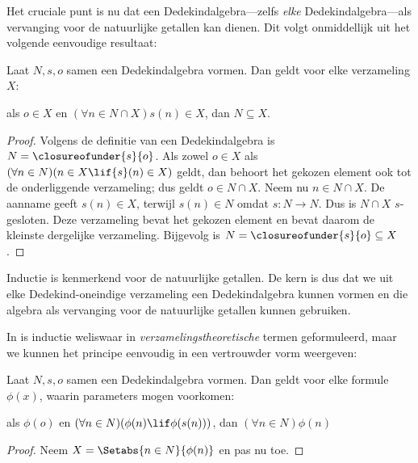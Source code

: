 \documentclass[../../../include/open-logic-section]{subfiles}
\begin{document}

Het cruciale punt is nu dat een Dedekindalgebra---zelfs \emph{elke}
Dedekindalgebra---als vervanging voor de natuurlijke getallen kan
dienen. Dit volgt onmiddellijk uit het volgende eenvoudige resultaat:

\begin{thm}
Laat $N, s, o$ samen een Dedekindalgebra vormen. Dan geldt voor elke
verzameling $X$:
	\begin{center}
		als $o \in X$ en $(\forall {n} \in N \cap X){s}({n}) \in X$, {dan} $N \subseteq X$.
	\end{center}
\end{thm}

\begin{proof}
Volgens de definitie van een Dedekindalgebra is $N =
\closureofunder{s}{o}$. Als zowel ${o} \in X$ als $(\forall {n} \in
N)(n \in X \lif {s}({n}) \in X)$ geldt, dan behoort het gekozen
element ook tot de onderliggende verzameling; dus geldt ${o} \in N
\cap X$. Neem nu ${n} \in N \cap X$. De aanname geeft
${s}({n}) \in X$, terwijl
${s}({n}) \in N$ omdat $s \colon N \to N$. Dus is $N \cap X$
$s$-gesloten. Deze verzameling bevat het gekozen element en bevat
daarom de kleinste dergelijke verzameling. Bijgevolg is $N =
\closureofunder{s}{o} \subseteq X$.
\end{proof}

Inductie is kenmerkend voor de natuurlijke getallen. De kern is dus dat
we uit elke Dedekind-oneindige verzameling een Dedekindalgebra kunnen
vormen en die algebra als vervanging voor de natuurlijke getallen
kunnen gebruiken.

In  is inductie weliswaar in
\emph{verzamelingstheoretische} termen geformuleerd, maar we kunnen
het principe eenvoudig in een vertrouwder vorm weergeven:

\begin{cor}
Laat $N, s, o$ samen een Dedekindalgebra vormen. Dan geldt voor elke
formule $\phi(x)$, waarin parameters mogen voorkomen:
\begin{center}
	als $\phi(o)$ en $(\forall {n} \in N)(\phi(n)\lif
	\phi({s}({n})))$, {dan} $(\forall n \in N)\phi(n)$
\end{center}
\end{cor}

\begin{proof}
Neem $X = \Setabs{n \in N}{\phi(n)}$ en pas nu
 toe.
\end{proof}
\end{document}
